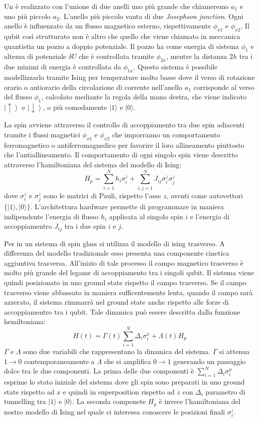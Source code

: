 Un  è realizzato con l'unione di due anelli uno più grande che chiameremo $a_1$ e uno più piccolo $a_2$. L'anello più piccolo vanta di due \textit{Josephson junction}. Ogni anello è influenzato da un flusso magnetico esterno, rispettivamente $\phi_{x1}$ e $\phi_{x2}$. Il qubit così strutturato non è altro che quello che viene chiamato in meccanica quantistia un pozzo a doppio potenziale. Il pozzo ha come energia di sistema $\phi_1$ e altezza di potenziale $\delta U$ che è controllata tramite $\phi_{2x}$, mentre la distanza $2h$ tra i due minimi di energia è controllata da $\phi_{1x}$.
Questo sistema è possibile modellizzarlo tramite Ising per temperature molto basse dove il verso di rotazione orario o antiorario della circolazione di corrente nell'anello $a_1$ corrisponde al verso del flusso $\phi_1$, calcolato mediante la regola della mano destra, che viene indicato $\left|\uparrow \right\rangle$ e $\left|\downarrow \right\rangle$, o più comodamente $|1 \rangle$ e $|0 \rangle$.

La  spin avviene attraverso il controllo di accoppiamento tra due spin adiacenti tramite i flussi magnetici $\phi_{x1}$ e $\phi_{x2}$ che imporranno un comportamento ferromagnetico o antiferromagnedico per favorire il loro allineamento piuttosto che l'antiallineamento.
Il comportamento di ogni singolo spin viene descritto attraverso l'hamiltoniana del sistema del modello di Ising:
$$H_p = \sum_{i=1}^N h_i \sigma_i^z + \sum_{i,j=1}^N J_{ij} \sigma_i^z \sigma_j^z$$
dove $\sigma_i^z$ e $\sigma_j^z$ sono le matrici di Pauli, rispetto l'asse $z$, aventi come autovettori $\{|1\rangle, |0\rangle\}$. L'architettura hardware permette di programmare in maniera indipendente l'energia di flusso $h_i$ applicata al singolo spin $i$ e l'energia di accoppiamentro $J_{ij}$ tra i due spin $i$ e $j$.

Per  in un sistema di spin glass si utilizza il modello di ising trasverso. A differenza del modello tradizionale esso presenta una componente cinetica aggiuntiva trasversa. All'inizio di tale processo il campo magnetico trasverso è molto più grande del legame di accoppiamento tra i singoli qubit. Il sistema viene quindi posizionato in uno ground state rispetto il campo trasverso. Se il campo trasverso viene abbassato in maniera sufficentemente lenta, quando il campo sarà azzerato, il sistema rimmarrà nel ground state anche rispetto alle forze di accoppiamentro tra i qubit. Tale dinamica può essere descritta dalla funzione hemiltoniana:
$$H(t) = \Gamma(t) \sum_{i=1}^N \Delta_i \sigma_i^x + \Lambda(t) H_p$$
$\Gamma$ e $\Lambda$ sono due variabili che rappresentano la dinamica del sistema. $\Gamma$ si attenua $1 \to 0$ contemporaneamente a $\Lambda$ che si amplifica $0 \to 1$ generando un passaggio dolce tra le due componenti. La prima delle due componenti è $\sum_{i=1}^N \Delta_i \sigma_i^x$ esprime lo stato iniziale del sistema dove gli spin sono preparati in uno ground state rispetto ad $x$ e quindi in superposition rispetto ad $z$ con $\Delta_i$ parametro di tunnelling tra $|1\rangle$ e $|0\rangle$. La seconda componete $H_p$ è invece l'hamiltoniana del nostro modello di Ising nel quale ci interessa conoscere le posizioni finali $\sigma_i^z$.

